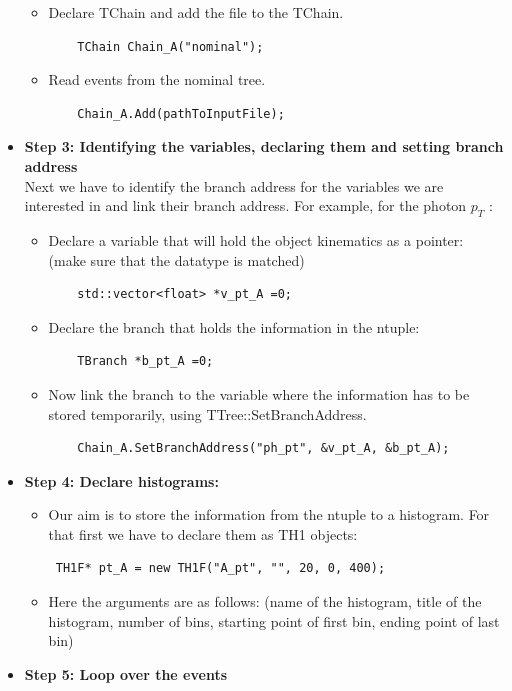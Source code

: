 \documentclass[letterpaper,12pt]{article}
\begin{document}
\begin{itemize}
\begin{itemize}
\begin{lstlisting}
\end{lstlisting}




\item Declare TChain and add the file to the TChain.  
			\begin{lstlisting}
	TChain Chain_A("nominal");
\end{lstlisting}
\item Read events from the nominal tree.
\begin{lstlisting}
	Chain_A.Add(pathToInputFile);

\end{lstlisting}
\end{itemize}
\item {\bf Step 3: Identifying the variables, declaring them and setting branch address}\\
 Next we have to identify the branch address for the variables we are interested in and link their branch address. For example, for the photon $p_{T}$ : 
\begin{itemize}
\item Declare a variable that will hold the object kinematics as a pointer: (make sure that the datatype is matched)
\begin{lstlisting}
	std::vector<float> *v_pt_A =0;
\end{lstlisting}
\item Declare the branch that holds the information in the ntuple:
\begin{lstlisting}
	TBranch *b_pt_A =0;
\end{lstlisting}

\item Now link the branch to the variable where the information has to be stored temporarily, using TTree::SetBranchAddress. %
\begin{lstlisting}
	Chain_A.SetBranchAddress("ph_pt", &v_pt_A, &b_pt_A);
\end{lstlisting}
\end{itemize}
\item {\bf Step 4: Declare histograms:}
\begin{itemize}
\item Our aim is to store the information from the ntuple to a histogram. For that first we have to declare them as TH1 objects:
 \begin{lstlisting}
 TH1F* pt_A = new TH1F("A_pt", "", 20, 0, 400);
\end{lstlisting}
\item Here the arguments are as follows: (name of the histogram, title of the histogram, number of bins, starting point of first bin, ending point of last bin)
	\end{itemize}
\item {\bf Step 5: Loop over the events}
\begin{itemize}


\end{itemize}
\end{itemize}
\end{document}
